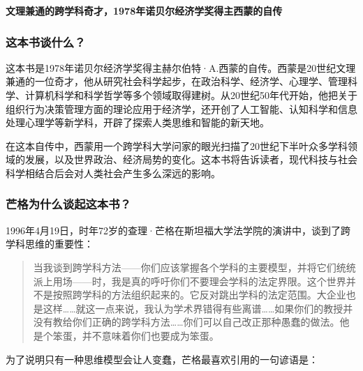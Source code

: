 \cleardoublepage
{}


\begin{BookSummaryBox}
\textbf{文理兼通的跨学科奇才，1978年诺贝尔经济学奖得主西蒙的自传}
\par
\end{BookSummaryBox}

\subsubsection*{这本书谈什么？}

这本书是1978年诺贝尔经济学奖得主赫尔伯特·A.西蒙的自传。西蒙是20世纪文理兼通的一位奇才，他从研究社会科学起步，在政治科学、经济学、心理学、管理科学、计算机科学和科学哲学等多个领域取得建树。从20世纪50年代开始，他把关于组织行为决策管理方面的理论应用于经济学，还开创了人工智能、认知科学和信息处理心理学等新学科，开辟了探索人类思维和智能的新天地。
\par

在这本自传中，西蒙用一个跨学科大学问家的眼光扫描了20世纪下半叶众多学科领域的发展，以及世界政治、经济局势的变化。这本书将告诉读者，现代科技与社会科学相结合后会对人类社会产生多么深远的影响。
\par

\subsubsection*{芒格为什么谈起这本书？}

1996年4月19日，时年72岁的查理·芒格在斯坦福大学法学院的演讲中，谈到了跨学科思维的重要性：
\par

\begin{quotation}
当我谈到跨学科方法——你们应该掌握各个学科的主要模型，并将它们统统派上用场——时，我是真的呼吁你们不要理会学科的法定界限。这个世界并不是按照跨学科的方法组织起来的。它反对跳出学科的法定范围。大企业也是这样……就这一点来说，我认为学术界错得有些离谱……如果你们的教授并没有教给你们正确的跨学科方法……你们可以自己改正那种愚蠢的做法。他是个笨蛋，并不意味着你们也要成为笨蛋。
\par
\end{quotation}

为了说明只有一种思维模型会让人变蠢，芒格最喜欢引用的一句谚语是：
\par

